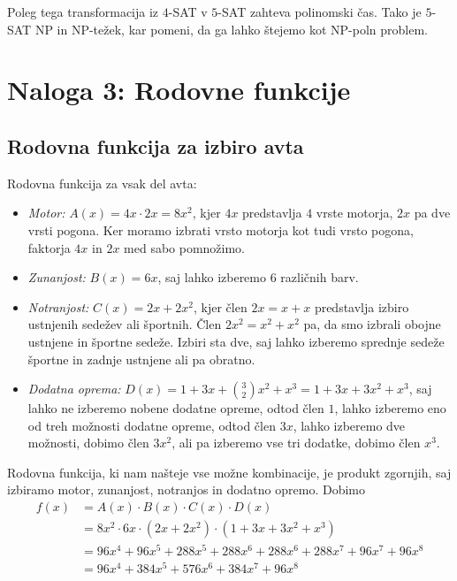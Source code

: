 \documentclass{article}
\begin{document}
    Poleg tega transformacija iz $4$-SAT v $5$-SAT zahteva polinomski čas. Tako je $5$-SAT NP in NP-težek, kar pomeni, da ga lahko štejemo kot NP-poln problem.


    \section*{Naloga 3: Rodovne funkcije}
    \subsection*{Rodovna funkcija za izbiro avta}

    Rodovna funkcija za vsak del avta:
    \begin{itemize}
        \item \textit{Motor:} $A(x) = 4x \cdot 2x = 8x^2$, kjer $4x$ predstavlja $4$ vrste motorja, $2x$ pa dve vrsti pogona. 
        Ker moramo izbrati vrsto motorja kot tudi vrsto pogona, faktorja $4x$ in $2x$ med sabo pomnožimo.
        \item \textit{Zunanjost:} $B(x) = 6x$, saj lahko izberemo $6$ različnih barv.
        \item \textit{Notranjost:} $C(x) = 2x + 2x^2$, kjer člen $2x = x + x$ predstavlja izbiro ustnjenih sedežev ali športnih.
        Člen $2x^2 = x^2 + x^2$ pa, da smo izbrali obojne ustnjene in športne sedeže. Izbiri sta dve, saj lahko izberemo sprednje
        sedeže športne in zadnje ustnjene ali pa obratno.
        \item \textit{Dodatna oprema:} $D(x) = 1 + 3x + \binom{3}{2} x^2 + x^3 = 1 + 3x + 3 x^2 + x^3 $, saj lahko ne izberemo nobene dodatne opreme, odtod člen $1$,
        lahko izberemo eno od treh možnosti dodatne opreme, odtod člen $3x$, lahko izberemo dve možnosti, dobimo člen $3x^2$,
        ali pa izberemo vse tri dodatke, dobimo člen $x^3$.
    \end{itemize}

    \noindent
    Rodovna funkcija, ki nam našteje vse možne kombinacije, je produkt zgornjih, saj izbiramo motor,
    zunanjost, notranjos in dodatno opremo. Dobimo
    \begin{align*}
        f(x) &= A(x) \cdot B(x) \cdot C(x) \cdot D(x) \\
        &= 8 x^2 \cdot 6x \cdot (2x + 2x^2) \cdot (1 + 3x + 3x^2 + x^3) \\
        &= 96 x^4 + 96 x^5 + 288 x^5 + 288 x^6 + 288 x^6 + 288 x^7 + 96 x^7 + 96 x^8 \\
        &= 96 x^4 + 384 x^5 + 576 x^6 + 384 x^7 + 96 x^8
    \end{align*}
\end{document}
